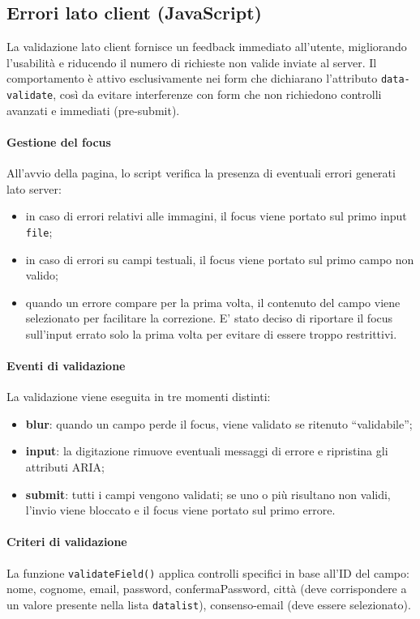 \documentclass[a4paper,12pt]{article}
\begin{document}
\subsection{Errori lato client (JavaScript)}

La validazione lato client fornisce un feedback immediato all’utente, migliorando l’usabilità e riducendo il numero di richieste non valide inviate al server.  
Il comportamento è attivo esclusivamente nei form che dichiarano l’attributo \texttt{data-validate}, così da evitare interferenze con form che non richiedono controlli avanzati e immediati (pre-submit).

\paragraph{Gestione del focus}
All’avvio della pagina, lo script verifica la presenza di eventuali errori generati lato server:
\begin{itemize}
    \item in caso di errori relativi alle immagini, il focus viene portato sul primo input \texttt{file};
    \item in caso di errori su campi testuali, il focus viene portato sul primo campo non valido;
    \item quando un errore compare per la prima volta, il contenuto del campo viene selezionato per facilitare la correzione. E' stato deciso di riportare il focus sull'input errato solo la prima volta per evitare di essere troppo restrittivi.
\end{itemize}

\paragraph{Eventi di validazione}
La validazione viene eseguita in tre momenti distinti:
\begin{itemize}
    \item \textbf{blur}: quando un campo perde il focus, viene validato se ritenuto “validabile”;
    \item \textbf{input}: la digitazione rimuove eventuali messaggi di errore e ripristina gli attributi ARIA;
    \item \textbf{submit}: tutti i campi vengono validati; se uno o più risultano non validi, l’invio viene bloccato e il focus viene portato sul primo errore.
\end{itemize}

\paragraph{Criteri di validazione}
La funzione \texttt{validateField()} applica controlli specifici in base all’ID del campo: nome, cognome, email, password, confermaPassword, città (deve corrispondere a un valore presente nella lista \texttt{datalist}), consenso-email (deve essere selezionato).
\end{document}

